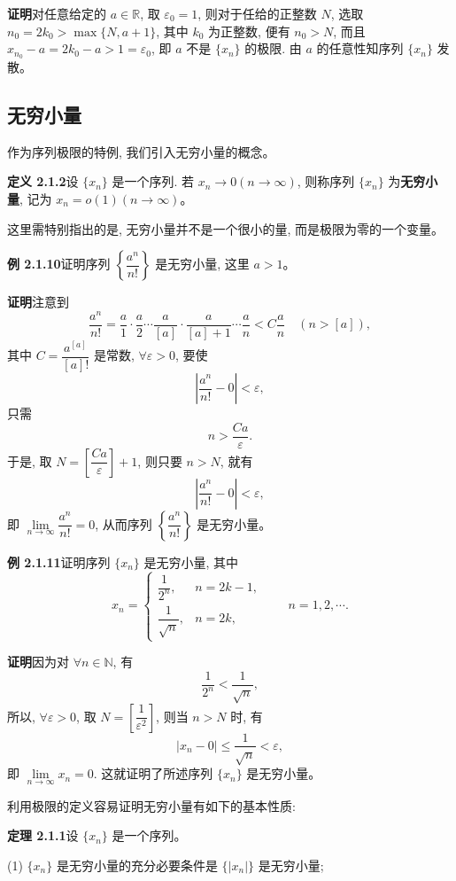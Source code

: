 \documentclass[UTF8, 12pt, fontset=fandol, oneside]{ctexart}
\begin{document}
\noindent\textbf{证明}\quad 对任意给定的 $a\in\mathbb{R}$, 取 $\varepsilon_0=1$, 则对于任给的正整数 $N$, 选取 $n_0=2k_0>\max\{N,a+1\}$, 其中 $k_0$ 为正整数, 便有 $n_0>N$, 而且 $x_{n_0}-a=2k_0-a>1=\varepsilon_0$, 即 $a$ 不是 $\{x_n\}$ 的极限. 由 $a$ 的任意性知序列 $\{x_n\}$ 发散。

\subsection{无穷小量}

作为序列极限的特例, 我们引入无穷小量的概念。

\noindent\textbf{定义 2.1.2}\quad 设 $\{x_n\}$ 是一个序列. 若 $x_n\to0(n\to\infty)$, 则称序列 $\{x_n\}$ 为\textbf{无穷小量}, 记为 $x_n=o(1)(n\to\infty)$。

这里需特别指出的是, 无穷小量并不是一个很小的量, 而是极限为零的一个变量。

\noindent\textbf{例 2.1.10}\quad 证明序列 $\left\{\dfrac{a^n}{n!}\right\}$ 是无穷小量, 这里 $a>1$。

\noindent\textbf{证明}\quad 注意到
\[
  \frac{a^n}{n!}
  =
  \frac a1\cdot\frac a2\cdots\frac a{[a]}\cdot
  \frac a{[a]+1}\cdots\frac an
  < C\frac an
  \quad(n>[a]),
\]
其中 $C=\dfrac{a^{[a]}}{[a]!}$ 是常数, $\forall\varepsilon>0$, 要使
\[
  \left|\frac{a^n}{n!}-0\right|<\varepsilon,
\]
只需
\[
  n>\frac{Ca}{\varepsilon}.
\]
于是, 取 $N=\left[\dfrac{Ca}{\varepsilon}\right]+1$, 则只要 $n>N$, 就有
\[
  \left|\frac{a^n}{n!}-0\right|<\varepsilon,
\]
即 $\lim\limits_{n\to\infty}\dfrac{a^n}{n!}=0$, 从而序列 $\left\{\dfrac{a^n}{n!}\right\}$ 是无穷小量。

\noindent\textbf{例 2.1.11}\quad 证明序列 $\{x_n\}$ 是无穷小量, 其中
\[
  x_n=
  \begin{cases}
    \dfrac1{2^n}, & n=2k-1,\\[0.4em]
    \dfrac1{\sqrt n}, & n=2k,
  \end{cases}
  \qquad n=1,2,\cdots .
\]

\noindent\textbf{证明}\quad 因为对 $\forall n\in\mathbb{N}$, 有
\[
  \frac1{2^n}<\frac1{\sqrt n},
\]
所以, $\forall\varepsilon>0$, 取 $N=\left[\dfrac1{\varepsilon^2}\right]$, 则当 $n>N$ 时, 有
\[
  |x_n-0|\leqslant\frac1{\sqrt n}<\varepsilon,
\]
即 $\lim\limits_{n\to\infty}x_n=0$. 这就证明了所述序列 $\{x_n\}$ 是无穷小量。

利用极限的定义容易证明无穷小量有如下的基本性质:

\noindent\textbf{定理 2.1.1}\quad 设 $\{x_n\}$ 是一个序列。

(1) $\{x_n\}$ 是无穷小量的充分必要条件是 $\{|x_n|\}$ 是无穷小量;
\end{document}
